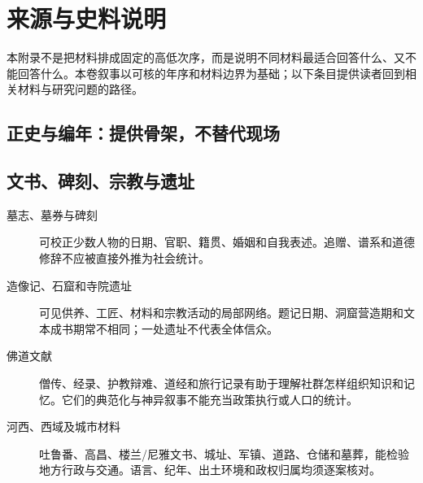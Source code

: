 \chapter{来源与史料说明}
\label{app:sources}

本附录不是把材料排成固定的高低次序，而是说明不同材料最适合回答什么、又不能回答什么。本卷叙事以可核的年序和材料边界为基础；以下条目提供读者回到相关材料与研究问题的路径。

\section{正史与编年：提供骨架，不替代现场}

\begin{description}
  \label{src:jinshu}
  \label{src:songshu}
  \label{src:nanqishu}
  \label{src:liangshu}
  \label{src:chenshu}
  \label{src:weishu}
  \label{src:beiqishu-zhoushu}
  \label{src:suishu}
  \label{src:zizhi-tongjian}
\end{description}

\section{文书、碑刻、宗教与遗址}

\label{src:material-record}
\begin{description}
  \item[墓志、墓券与碑刻] 可校正少数人物的日期、官职、籍贯、婚姻和自我表述。追赠、谱系和道德修辞不应被直接外推为社会统计。
  \item[造像记、石窟和寺院遗址] 可见供养、工匠、材料和宗教活动的局部网络。题记日期、洞窟营造期和文本成书期常不相同；一处遗址不代表全体信众。
  \item[佛道文献] 僧传、经录、护教辩难、道经和旅行记录有助于理解社群怎样组织知识和记忆。它们的典范化与神异叙事不能充当政策执行或人口的统计。
  \item[河西、西域及城市材料] 吐鲁番、高昌、楼兰/尼雅文书、城址、军镇、道路、仓储和墓葬，能检验地方行政与交通。语言、纪年、出土环境和政权归属均须逐案核对。
\end{description}

